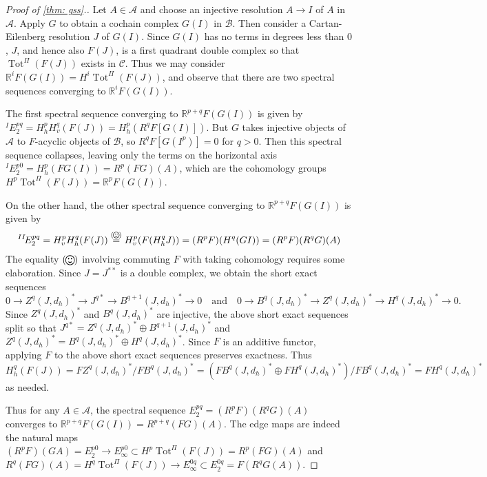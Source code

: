 \documentclass[11pt,leqno]{article}
\theoremstyle{plain}
\theoremstyle{definition}
\numberwithin{equation}{section}
\numberwithin{lem}{section}
\newcommand{\eq}[1]{\overset{(#1)}{=}}
\DeclareMathOperator{\Tot}{Tot}
\newcommand{\smallhappy}{\raisebox{-.14em}{\smiley}}
\newcommand{\happy}{\raisebox{-.24em}{\resizebox{1.2em}{!}{\smiley}}}
\DeclareMathOperator{\mathhappy}{\!\happy\!}
\DeclareMathOperator{\smallmathhappy}{\!\smallhappy\!}
\begin{document}
\begin{proof}[Proof of \cref{thm: gss}.]
  Let $A\in \mathcal A$ and choose an injective resolution $A\to I$ of $A$ in $\mathcal A$. Apply $G$ to obtain a cochain complex $G(I)$ in $\mathcal B$. Then consider a Cartan-Eilenberg resolution $J$ of $G(I)$. Since $G(I)$ has no terms in degrees less than $0$, $J$, and hence also $F(J)$, is a first quadrant double complex so that $\Tot^\Pi(F(J))$ exists in $\mathcal C$. Thus we may consider $\mathbb R^iF(G(I)) = H^i\Tot^\Pi(F(J))$, and observe that there are two spectral sequences converging to $\mathbb R^iF(G(I))$.

  The first spectral sequence converging to $\mathbb R^{p+q}F(G(I))$ is given by ${}^{I}\!E_2^{pq} = H_h^pH_v^q(F(J)) = H_h^p(R^qF[G(I)])$. But $G$ takes injective objects of $\mathcal A$ to $F$-acyclic objects of $\mathcal B$, so $R^qF[G(I^p)] = 0$ for $q>0$. Then this spectral sequence collapses, leaving only the terms on the horizontal axis ${}^{I}\!E_2^{p0} = H_h^p(FG(I)) = R^p(FG)(A)$, which are the cohomology groups $H^p\Tot^\Pi(F(J)) = \mathbb R^pF(G(I))$.

  On the other hand, the other spectral sequence converging to $\mathbb R^{p+q}F(G(I))$ is given by
  \[{}^{II}\!E_2^{pq} = H_v^pH_h^q(F(J)) \eq{\smallmathhappy} H_v^p(F(H_h^qJ)) = (R^pF)(H^q(GI)) = (R^pF)(R^qG)(A)\]
  The equality $(\mathhappy)$ involving commuting $F$ with taking cohomology requires some elaboration. Since $J = J^{\ast\ast}$ is a double complex, we obtain the short exact sequences 
  \[0\to Z^q(J,d_h)^\ast\to J^{q\ast}\to B^{q+1}(J,d_h)^\ast\to 0\quad\text{and}\quad 0\to B^q(J,d_h)^\ast\to Z^q(J,d_h)^\ast\to H^q(J,d_h)^\ast\to 0.\]
  Since $Z^q(J,d_h)^\ast$ and $B^q(J,d_h)^\ast$ are injective, the above short exact sequences split so that $J^{q\ast} = Z^q(J,d_h)^\ast\oplus B^{q+1}(J,d_h)^\ast$ and $Z^q(J,d_h)^\ast = B^q(J,d_h)^\ast \oplus H^q(J,d_h)^\ast$. Since $F$ is an additive functor, applying $F$ to the above short exact sequences preserves exactness. Thus $H_h^q(F(J)) = FZ^q(J,d_h)^\ast/FB^q(J,d_h)^\ast = (FB^q(J,d_h)^\ast\oplus FH^q(J,d_h)^\ast)/FB^q(J,d_h)^\ast = FH^q(J,d_h)^\ast$ as needed.

  Thus for any $A\in\mathcal A$, the spectral sequence $E_2^{pq} = (R^pF)(R^qG)(A)$ converges to $\mathbb R^{p+q}F(G(I)) = R^{p+q}(FG)(A)$. The edge maps are indeed the natural maps $(R^pF)(GA) = E_2^{p0}\to E_\infty^{p0}\subset H^p\Tot^\Pi(F(J)) = R^p(FG)(A)$ and $R^q(FG)(A) = H^q\Tot^\Pi(F(J))\to E_\infty^{0q}\subset E_2^{0q} = F(R^qG(A))$.


\end{proof}
\end{document}
